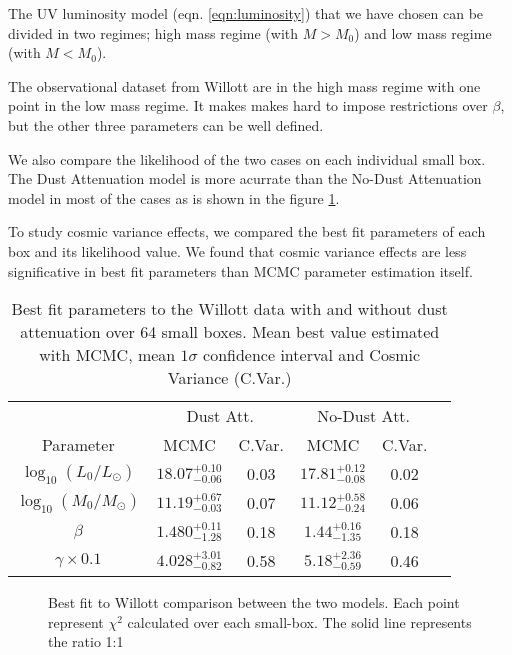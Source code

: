 \documentclass{emulateapj}
\begin{document}
The UV luminosity model (eqn. \ref{eqn:luminosity}) that we have 
chosen can be divided in two regimes; high mass regime 
(with $M > M_0$) and low mass regime (with $M < M_0$).

The observational dataset from Willott are in the high mass regime 
with one point in the low mass regime. It makes makes hard to impose
restrictions over $\beta$, but the other three parameters can be
well defined.

We also compare the likelihood of the two cases on each individual 
small box. The Dust Attenuation model is more acurrate than the
No-Dust Attenuation model in most of the cases as is shown in the figure 
\ref{fig:OD1_chi2_comparison}.

To study cosmic variance effects, we compared the best fit parameters
of each box and its likelihood value. We found that cosmic variance
effects are less significative in best fit parameters than MCMC parameter
estimation itself. 

\begin{table}
\begin{center}
\begin{tabular}{cccccc}\hline\hline
 & \multicolumn{2}{c}{Dust Att.} & \multicolumn{2}{c}{No-Dust Att.}\\
Parameter                  & MCMC                  & C.Var. & MCMC                    & C.Var. \\\hline
$\log_{10}(L_0/L_{\odot})$ & $18.07_{-0.06}^{+0.10}$ & 0.03 & $17.81_{-0.08}^{+0.12}$ & 0.02  \\
$\log_{10}(M_0/M_{\odot})$ & $11.19_{-0.03}^{+0.67}$ & 0.07 & $11.12_{-0.24}^{+0.58}$ & 0.06  \\
$\beta$                    & $1.480_{-1.28}^{+0.11}$ & 0.18 & $ 1.44_{-1.35}^{+0.16}$ & 0.18  \\
$\gamma\times0.1$          & $4.028_{-0.82}^{+3.01}$ & 0.58 & $ 5.18_{-0.59}^{+2.36}$ & 0.46  \\
\hline\hline
\end{tabular}
\caption{ Best fit parameters to the Willott data with and without 
dust attenuation over 64 small boxes. Mean best value estimated 
with MCMC, mean $1\sigma$ confidence interval and Cosmic Variance
(C.Var.)
} 
\label{table:Willott_best_fit_parameters_no_dust}
\end{center}
\end{table}


\begin{figure}
\caption{Best fit to Willott comparison between the two models. Each point represent $\chi^2$ 
calculated over each small-box. The solid line represents the ratio 1:1 }
\label{fig:OD1_chi2_comparison}
\end{figure}
\end{document}
